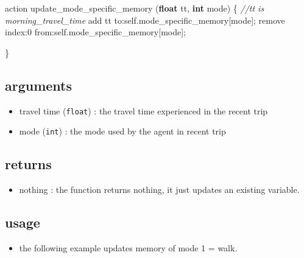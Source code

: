 \documentclass[]{book}
\newenvironment{Shaded}{\begin{snugshade}}{\end{snugshade}}
\newcommand{\CommentTok}[1]{\textcolor[rgb]{0.56,0.35,0.01}{\textit{#1}}}
\newcommand{\DecValTok}[1]{\textcolor[rgb]{0.00,0.00,0.81}{#1}}
\newcommand{\KeywordTok}[1]{\textcolor[rgb]{0.13,0.29,0.53}{\textbf{#1}}}
\newcommand{\NormalTok}[1]{#1}
\newcommand{\OtherTok}[1]{\textcolor[rgb]{0.56,0.35,0.01}{#1}}
\providecommand{\tightlist}{%
  \setlength{\itemsep}{0pt}\setlength{\parskip}{0pt}}
\theoremstyle{definition}
\theoremstyle{definition}
\theoremstyle{definition}
\theoremstyle{remark}
\begin{document}
\begin{Shaded}
\begin{Highlighting}[]
\NormalTok{action update_mode_specific_memory }\OtherTok{(}\KeywordTok{float}\NormalTok{ tt}\OtherTok{,} \KeywordTok{int}\NormalTok{ mode}\OtherTok{)}
\NormalTok{  \{}
        \CommentTok{//tt is morning_travel_time}
\NormalTok{        add tt to:self.mode_specific_memory}\OtherTok{[}\NormalTok{mode}\OtherTok{];}
\NormalTok{        remove index:}\DecValTok{0}\NormalTok{ from:self.mode_specific_memory}\OtherTok{[}\NormalTok{mode}\OtherTok{];}
        
\NormalTok{    \}}
\end{Highlighting}
\end{Shaded}

\hypertarget{arguments}{%
\subsection*{arguments}\label{arguments}}

\begin{itemize}
\tightlist
\item
  travel time (\texttt{float}) : the travel time experienced in the
  recent trip
\item
  mode (\texttt{int}) : the mode used by the agent in recent trip
\end{itemize}

\hypertarget{returns}{%
\subsection*{returns}\label{returns}}

\begin{itemize}
\tightlist
\item
  nothing : the function returns nothing, it just updates an existing
  variable.
\end{itemize}

\hypertarget{usage}{%
\subsection*{usage}\label{usage}}

\begin{itemize}
\tightlist
\item
  the following example updates memory of mode 1 = walk.
\end{itemize}
\end{document}
